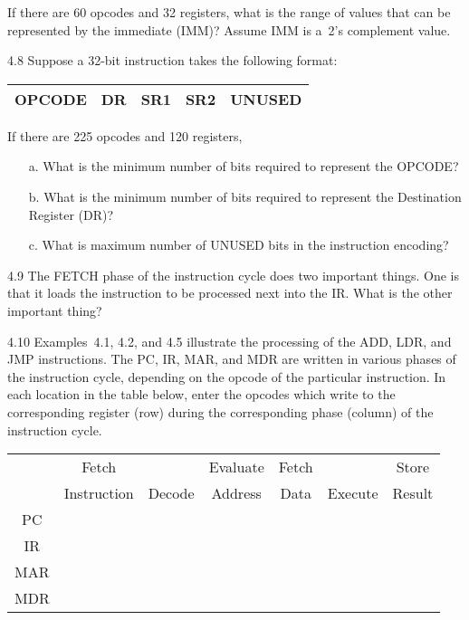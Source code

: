 \documentclass{patt}
\begin{document}
\begin{exercises}
\noindent If there are 60 opcodes and 32 registers, what is the range of
values that can be represented by the immediate (IMM)? Assume
IMM is a~2's complement value.

\item[4.8] Suppose a 32-bit instruction takes the following format:

\begin{center}
\begin{tabular}{|c|c|c|c|c|} \hline
\rule{0pt}{10pt}OPCODE\rule{0pt}{10pt} & DR & SR1 & SR2 & UNUSED\\ \hline
\end{tabular}
\end{center}

\noindent If there are 225 opcodes and 120 registers,
\begin{enumerate}
\item[a.] What is the minimum number of bits required to represent the OPCODE?
\item[b.] What is the minimum number of bits required to represent the Destination Register (DR)?
\item[c.] What is maximum number of UNUSED bits in the instruction encoding?
\end{enumerate}

\item[4.9]
The FETCH phase of the instruction cycle does two important things. One is
that it loads the instruction to be processed next into the IR. What is
the other important thing?

\enlargethispage{-\baselineskip}

\item[4.10] Examples~4.1, 4.2, and 4.5 illustrate the processing of
  the ADD, LDR, and JMP instructions. The PC, IR, MAR, and MDR are
  written in various phases of the instruction cycle, depending on the
  opcode of the particular instruction. In each location in the table
  below, enter the opcodes\vadjust{\pagebreak}
  which write to the corresponding register
  (row) during the corresponding phase (column) of the instruction
  cycle.

\medskip
\vspace{6pt}

{\fontsize{9}{13}\selectfont
\noindent\begin{tabular}{|c|c|c|c|c|c|c|}
\hline
& Fetch  &  & Evaluate & Fetch & & Store\\[-2pt]
&Instruction & Decode &Address & Data
& Execute &Result\\
\hline
\rule{0pt}{10pt}PC\rule{0pt}{10pt} & & & & & &\\
\hline
\rule{0pt}{10pt}IR\rule{0pt}{10pt} & & & & & &\\
\hline
\rule{0pt}{10pt}MAR\rule{0pt}{10pt} & & & & & &\\
\hline
\rule{0pt}{10pt}MDR\rule{0pt}{10pt} & & & & & &\\
\hline
\end{tabular}}


\end{exercises}
\end{document}
